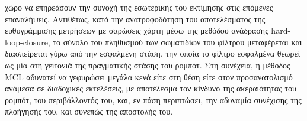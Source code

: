 χώρο να επηρεάσουν την συνοχή της εσωτερικής του εκτίμησης στις επόμενες
επαναλήψεις. Αντιθέτως, κατά την ανατροφοδότηση του αποτελέσματος της
ευθυγράμμισης μετρήσεων με σαρώσεις χάρτη μέσω της μεθόδου ανάδρασης
hard-loop-closure, το σύνολο του πληθυσμού των σωματιδίων του φίλτρου
μεταφέρεται και διασπείρεται γύρω από την εσφαλμένη στάση, την οποία το φίλτρο
εσφαλμένα θεωρεί ως μία στη γειτονιά της πραγματικής στάσης του ρομπότ.  Στη
συνέχεια, η μέθοδος MCL αδυνατεί να γεφυρώσει μεγάλα κενά είτε στη θέση είτε
στον προσανατολισμό ανάμεσα σε διαδοχικές εκτελέσεις, με αποτέλεσμα τον κίνδυνο
της ακεραιότητας του ρομπότ, του περιβάλλοντός του, και, εν πάση περιπτώσει,
την αδυναμία συνέχισης της πλοήγησής του, και συνεπώς της αποστολής του.
